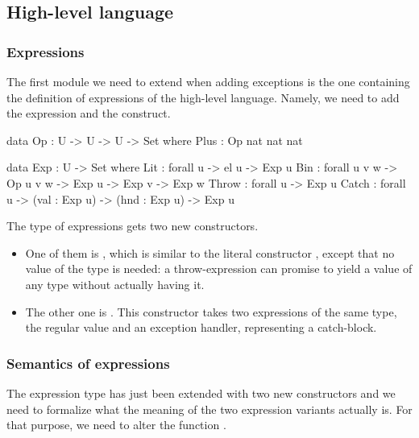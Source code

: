 \subsection{High-level language}

\subsubsection{Expressions}

The first module we need to extend when adding exceptions is the one containing
the definition of expressions of the high-level language. Namely, we need to
add the  expression and the  construct.

\begin{code}
  data Op : U -> U -> U -> Set where
    Plus : Op nat nat nat
\end{code}

\begin{code}
  data Exp : U -> Set where
    Lit : forall {u} -> el u -> Exp u
    Bin : forall {u v w} -> Op u v w -> Exp u -> Exp v -> Exp w
    Throw : forall {u} -> Exp u
    Catch : forall {u} -> (val : Exp u) -> (hnd : Exp u) -> Exp u
\end{code}

\noindent The type of expressions gets two new constructors.
\begin{itemize}

  \item One of them is , which is similar to the literal
    constructor , except that no value of the type  is
    needed: a throw-expression can promise to yield a value of any type without
    actually having it.

  \item The other one is . This constructor takes two expressions of
    the same type, the regular value and an exception handler, representing a
    catch-block.

\end{itemize}

\subsubsection{Semantics of expressions}
\label{sec:expression-semantics}

The expression type has just been extended with two new constructors and we
need to formalize what the meaning of the two expression variants actually is.
For that purpose, we need to alter the function .

